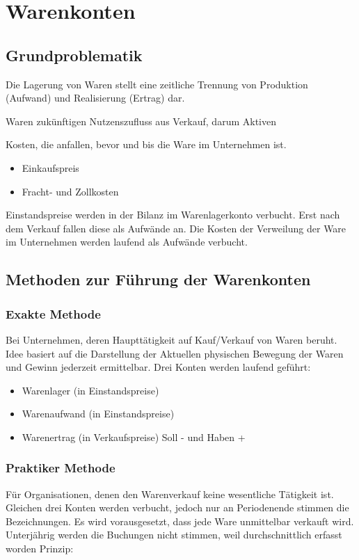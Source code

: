 
\section{Warenkonten}

\subsection{Grundproblematik}
Die Lagerung von Waren stellt eine zeitliche Trennung von Produktion (Aufwand) und Realisierung (Ertrag) dar.

Waren zukünftigen Nutzenszufluss aus Verkauf, darum Aktiven
\begin{definition}
    [Einstandspreis] Kosten, die anfallen, bevor und bis die Ware im Unternehmen ist.
    \begin{itemize}
        \item Einkaufspreis
        \item Fracht- und Zollkosten
    \end{itemize}
\end{definition}

Einstandspreise werden in der Bilanz im Warenlagerkonto verbucht. Erst nach dem Verkauf fallen diese als Aufwände an.
Die Kosten der Verweilung der Ware im Unternehmen werden laufend als Aufwände verbucht.


\subsection{Methoden zur Führung der Warenkonten}

\subsubsection{Exakte Methode}
Bei Unternehmen, deren Haupttätigkeit auf Kauf/Verkauf von Waren beruht.
Idee basiert auf die Darstellung der Aktuellen physischen Bewegung der Waren und  Gewinn jederzeit ermittelbar.
Drei Konten werden laufend geführt:
\begin{itemize}
    \item Warenlager (in Einstandspreise)
    \item Warenaufwand (in Einstandspreise)
    \item Warenertrag (in Verkaufspreise) Soll - und Haben +
\end{itemize}

\subsubsection{Praktiker Methode}
Für Organisationen, denen den Warenverkauf keine wesentliche Tätigkeit ist.
Gleichen drei Konten werden verbucht, jedoch nur an Periodenende stimmen die Bezeichnungen.
Es wird vorausgesetzt, dass jede Ware unmittelbar verkauft wird.
Unterjährig werden die Buchungen nicht stimmen, weil durchschnittlich erfasst worden
Prinzip:

